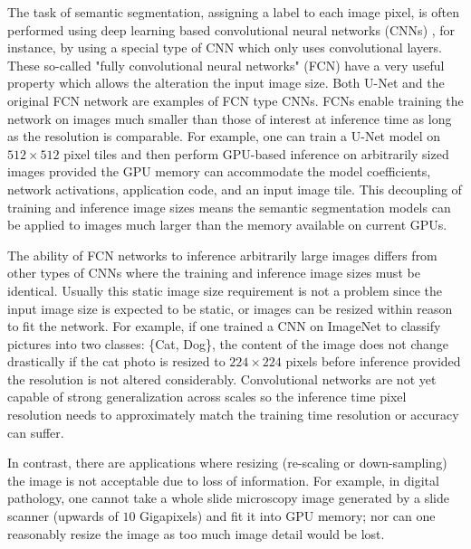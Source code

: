 \documentclass[runningheads]{llncs}
\begin{document}
The task of semantic segmentation, assigning a label to each image pixel, is often performed using deep learning based convolutional neural networks (CNNs) \cite{Badrinarayanan2015a,Ronneberger2015a}, for instance, by using a special type of CNN which only uses convolutional layers.
These so-called "fully convolutional neural networks" (FCN) have a very useful property which allows the alteration the input image size. 
Both U-Net \cite{Ronneberger2015a} and the original FCN network \cite{Long2015} are examples of FCN type CNNs. 
FCNs enable training the network on images much smaller than those of interest at inference time as long as the resolution is comparable. 
For example, one can train a U-Net model on $512 \times 512$ pixel tiles and then perform GPU-based inference on arbitrarily sized images provided the GPU memory can accommodate the model coefficients, network activations, application code, and an input image tile. This decoupling of training and inference image sizes means the semantic segmentation models can be applied to images much larger than the memory available on current GPUs. 

The ability of FCN networks to inference arbitrarily large images differs from other types of CNNs where the training and inference image sizes must be identical. Usually this static image size requirement is not a problem since the input image size is expected to be static, or images can be resized within reason to fit the network. For example, if one trained a CNN on ImageNet \cite{Russakovsky2015} to classify pictures into two classes: \{Cat, Dog\}, the content of the image does not change drastically if the cat photo is resized to $224 \times 224$ pixels before inference provided the resolution is not altered considerably. Convolutional networks are not yet capable of strong generalization across scales \cite{Jaderberg2015,Lin2017a} so the inference time pixel resolution needs to approximately match the training time resolution or accuracy can suffer.

In contrast, there are applications where resizing (re-scaling or down-sampling) the image is not acceptable due to loss of information. For example, in digital pathology, one cannot take a whole slide microscopy image generated by a slide scanner (upwards of $\num{10}$ Gigapixels) and fit it into GPU memory; nor can one reasonably resize the image as too much image detail would be lost. 
\end{document}

